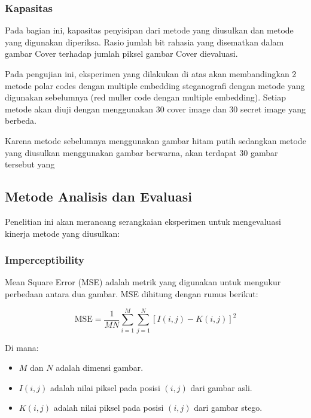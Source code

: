 \documentclass{ittelkom}
\begin{document}
\subsubsection{Kapasitas}

Pada bagian ini, kapasitas penyisipan dari metode yang diusulkan dan metode
yang digunakan diperiksa. Rasio jumlah bit rahasia yang disematkan dalam gambar
Cover terhadap jumlah piksel gambar Cover dievaluasi.

Pada pengujian ini, eksperimen yang dilakukan di atas akan membandingkan 2
metode polar codes dengan multiple embedding steganografi dengan metode yang
digunakan sebelumnya (red muller code dengan multiple embedding). Setiap metode
akan diuji dengan menggunakan 30 cover image dan 30 secret image yang berbeda.

Karena metode sebelumnya menggunakan gambar hitam putih sedangkan metode yang
diusulkan menggunakan gambar berwarna, akan terdapat 30 gambar tersebut yang

\subsection{Metode Analisis dan Evaluasi}

Penelitian ini akan merancang serangkaian eksperimen untuk mengevaluasi kinerja
metode yang diusulkan:

\subsubsection{Imperceptibility}


Mean Square Error (MSE) adalah metrik yang digunakan untuk mengukur perbedaan
antara dua gambar. MSE dihitung dengan rumus berikut:

\begin{equation}
    \text{MSE} = \frac{1}{MN} \sum_{i=1}^{M} \sum_{j=1}^{N} [I(i,j) - K(i,j)]^2
\end{equation}

Di mana:
\begin{itemize}
    \item $M$ dan $N$ adalah dimensi gambar.
    \item $I(i,j)$ adalah nilai piksel pada posisi $(i,j)$ dari gambar asli.
    \item $K(i,j)$ adalah nilai piksel pada posisi $(i,j)$ dari gambar stego.
\end{itemize}
\end{document}
